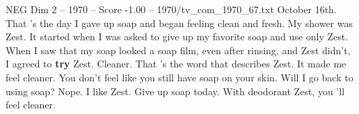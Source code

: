 \begin{textsample}{NEG Dim 2 – 1970 – Score -1.00 – 1970/tv\_com\_1970\_67.txt}  \label{ex:f2_neg_050}
October 16th.
That 's the day I gave up soap and began feeling clean and fresh.
My shower was Zest.
It started when I was asked to give up my favorite soap and use only Zest.
When I saw that my soap looked a soap film, even after rinsing, and Zest didn't, I agreed to \textbf{try} Zest.
Cleaner.
That 's the word that describes Zest.
It made me feel cleaner.
You don't feel like you still have soap on your skin.
Will I go back to using soap?
Nope.
I like Zest.
Give up soap today.
With deodorant Zest, you 'll feel cleaner.

\end{textsample}
